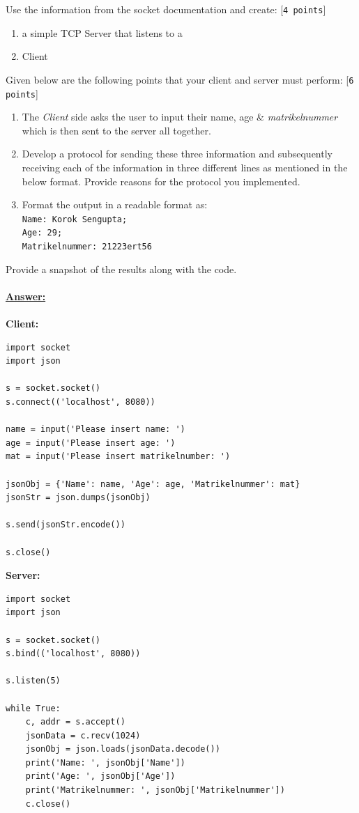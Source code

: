 \documentclass{scrartcl}
\begin{document}
Use the information from the socket documentation and create: [\texttt{4 points}]
\begin{enumerate}
\item a simple TCP Server that listens to a
\item Client
\end{enumerate}
Given below are the following points that your client and server must perform: [\texttt{6 points}]
\begin{enumerate}
\item The \emph{Client} side asks the user to input their name, age \& \emph{matrikelnummer} which is then sent to the server all together.
\item Develop a protocol for sending these three information and subsequently receiving each of the information in three different lines as mentioned in the below format. Provide reasons for the protocol you implemented. 
\item Format the output in a readable format as:\texttt{\\ Name: Korok Sengupta; \\ Age: 29; \\ Matrikelnummer: 21223ert56}
\end{enumerate}

Provide a snapshot of the results along with the code. \\
\\
\textbf{\underline{Answer:}}\\
\\
\textbf{Client:}

\begin{lstlisting}
import socket
import json

s = socket.socket()
s.connect(('localhost', 8080))

name = input('Please insert name: ')
age = input('Please insert age: ')
mat = input('Please insert matrikelnumber: ')

jsonObj = {'Name': name, 'Age': age, 'Matrikelnummer': mat}
jsonStr = json.dumps(jsonObj)

s.send(jsonStr.encode())

s.close()
\end{lstlisting}
\newpage
\textbf{Server:}

\begin{lstlisting}
import socket
import json

s = socket.socket()
s.bind(('localhost', 8080))

s.listen(5)

while True:
	c, addr = s.accept()
	jsonData = c.recv(1024)
	jsonObj = json.loads(jsonData.decode())
	print('Name: ', jsonObj['Name'])
	print('Age: ', jsonObj['Age'])
	print('Matrikelnummer: ', jsonObj['Matrikelnummer'])
	c.close()
\end{lstlisting}
\end{document}
